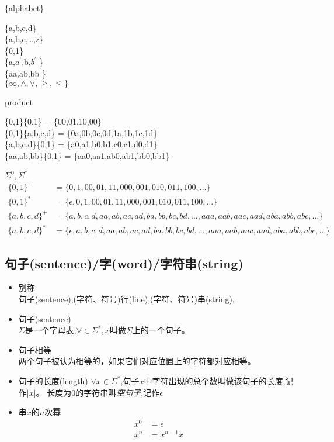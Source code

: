 \begin{example} \{alphabet\}
	\begin{flushleft}
		\{a,b,c,d\}\\
		\{a,b,c,\dots,z\}\\
		\{0,1\} \\
		\{a,$a^{\prime}$,b,$b^{\prime}$ \}\\
		\{aa,ab,bb \}\\
		$\{\infty,\land,\lor,\geq,\leq \}$
	\end{flushleft}
\end{example}

\begin{example} product
	\begin{flushleft}
		\{0,1\}\{0,1\} = \{00,01,10,00\}\\
		\{0,1\}\{a,b,c,d\} = \{0a,0b,0c,0d,1a,1b,1c,1d\}\\
		\{a,b,c,d\}\{0,1\} = \{a0,a1,b0,b1,c0,c1,d0,d1\}\\
		\{aa,ab,bb\}\{0,1\} = \{aa0,aa1,ab0,ab1,bb0,bb1\}
	\end{flushleft}
\end{example}

\begin{example} $\Sigma^0,\Sigma^{\ast}$ 
	\begin{align*}
	\{0,1\}^+ &= \{0,1,00,01,11,000,001,010,011,100,\dots\}\\
	\{0,1\}^{\ast} &= \{\epsilon,0,1,00,01,11,000,001,010,011,100,\dots\}\\
	\{a,b,c,d\}^+ &= \{a,b,c,d,aa,ab,ac,ad,ba,bb,bc,bd,\dots,aaa,aab,aac,aad,aba,abb,abc,\dots\}\\
	\{a,b,c,d\}^{\ast} &= \{\epsilon,a,b,c,d,aa,ab,ac,ad,ba,bb,bc,bd,\dots,aaa,aab,aac,aad,aba,abb,abc,\dots\}
	\end{align*}
\end{example}

\subsection{句子(sentence)/字(word)/字符串(string)}
\begin{itemize}
	\item 别称\\
		句子(sentence),(字符、符号)行(line),(字符、符号)串(string).
	\item 句子(sentence)\\
		$\Sigma$是一个字母表,$\forall \in \Sigma^{\ast},x$叫做$\Sigma$上的一个句子。
	\item 句子相等\\
		两个句子被认为相等的，如果它们对应位置上的字符都对应相等。
	\item 句子的长度(length)
		\subitem{-} $\forall x\in \Sigma^{\ast}$,句子$x$中字符出现的总个数叫做该句子的长度,记作$|x|$。
		\subitem{-} 长度为0的字符串叫\emph{空句子},记作$\epsilon$
	\item 串$x$的$n$次幂
	\begin{align*}
		x^0 &= \epsilon \\
		x^n &= x^{n-1}x
	\end{align*}
\end{itemize}


